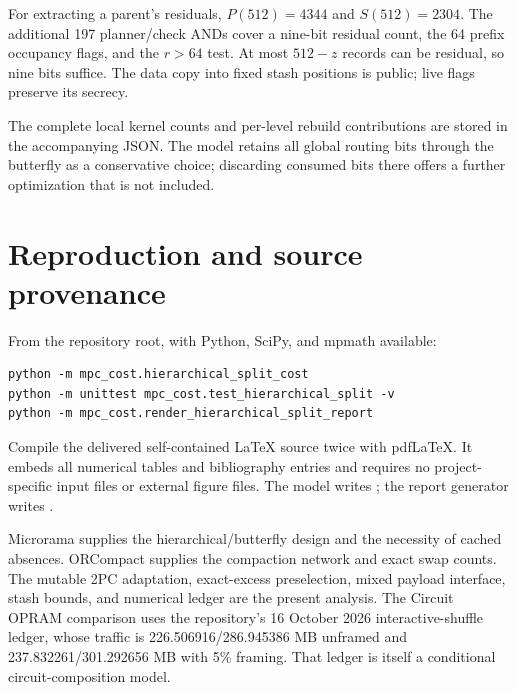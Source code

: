 \documentclass[11pt]{article}
\begin{document}
For extracting a parent's residuals, $P(512)=4344$ and $S(512)=2304$.
The additional 197 planner/check ANDs cover a nine-bit residual count,
the 64 prefix occupancy flags, and the $r>64$ test. At most $512-z$
records can be residual, so nine bits suffice. The data copy into fixed
stash positions is public; live flags preserve its secrecy.

The complete local kernel counts and per-level rebuild contributions are
stored in the accompanying JSON. The model retains all global routing
bits through the butterfly as a conservative choice; discarding consumed
bits there offers a further optimization that is not included.

\section{Reproduction and source provenance}
From the repository root, with Python, SciPy, and mpmath available:
\begin{verbatim}
python -m mpc_cost.hierarchical_split_cost
python -m unittest mpc_cost.test_hierarchical_split -v
python -m mpc_cost.render_hierarchical_split_report
\end{verbatim}
Compile the delivered self-contained LaTeX source twice with pdfLaTeX.
It embeds all numerical tables and bibliography entries and requires no
project-specific input files or external figure files. The model writes
; the report
generator writes .

Microrama supplies the hierarchical/butterfly design and the necessity of
cached absences. ORCompact supplies the compaction network and exact swap
counts. The mutable 2PC adaptation, exact-excess preselection, mixed
payload interface, stash bounds, and numerical ledger are the present
analysis. The Circuit OPRAM comparison uses the repository's 16 October
2026 interactive-shuffle ledger, whose traffic is 226.506916/286.945386 MB
unframed and 237.832261/301.292656 MB with 5\% framing. That ledger is
itself a conditional circuit-composition model.
\end{document}
